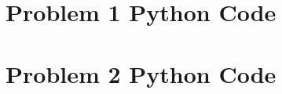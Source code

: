 \documentclass[../main.tex]{subfiles}
\begin{document}
	\begin{appendices}
		\section{Problem 1 Python Code}
		\label{Problem1Python}
		
		\newpage

		\section{Problem 2 Python Code}
		\label{Problem2Python}
		
		\newpage
	\end{appendices}
\end{document}
